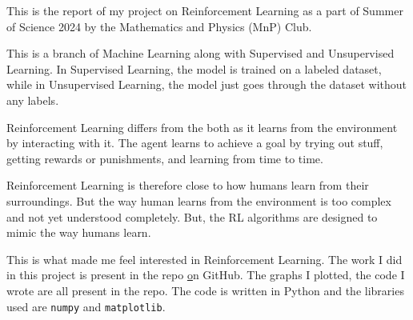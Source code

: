 This is the report of my project on Reinforcement Learning as a part of Summer of Science 2024 by the Mathematics and Physics (MnP) Club.

This is a branch of Machine Learning along with Supervised and Unsupervised Learning. In Supervised Learning, the model is trained on a labeled dataset, while in Unsupervised Learning, the model just goes through the dataset without any labels.

Reinforcement Learning differs from the both as it learns from the environment by interacting with it. The agent learns to achieve a goal by trying out stuff, getting rewards or punishments, and learning from time to time.

Reinforcement Learning is therefore close to how humans learn from their surroundings. But the way human learns from the environment is too complex and not yet understood completely. But, the RL algorithms are designed to mimic the way humans learn.

This is what made me feel interested in Reinforcement Learning. The work I did in this project is present in the repo \href{https://github.com/balaji1029/reinforcement-learning-sos/} on GitHub. The graphs I plotted, the code I wrote are all present in the repo. The code is written in Python and the libraries used are \texttt{numpy} and \texttt{matplotlib}.